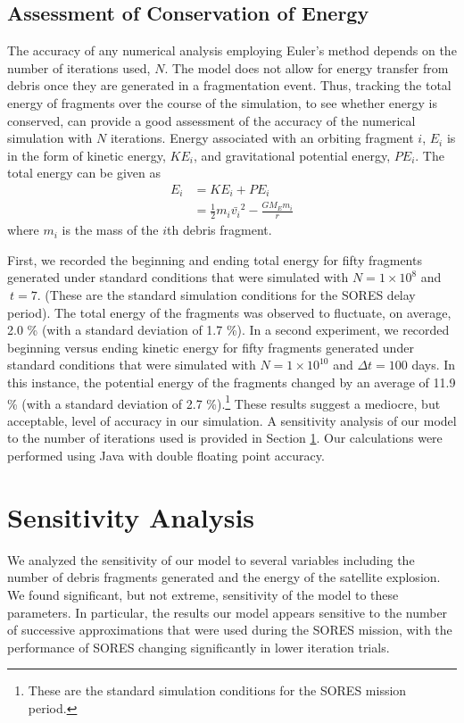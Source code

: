 \documentclass[12pt]{scrartcl}
\begin{document}
\subsection{Assessment of Conservation of Energy} \label{subsec:cons_energy}

The accuracy of any numerical analysis employing Euler's method depends on the number of iterations used, $N$. The model does not allow for energy transfer from debris once they are generated in a fragmentation event. Thus, tracking the total energy of fragments over the course of the simulation, to see whether energy is conserved, can provide a good assessment of the accuracy of the numerical simulation with $N$ iterations. Energy associated with an orbiting fragment $i$, $E_{i}$ is in the form of kinetic energy, $\mathit{KE}_{i}$, and gravitational potential energy, $\mathit{PE}_{i}$. The total energy can be given as 
\begin{align}
E_{i} 
&= \mathit{KE}_{i} + \mathit{PE}_{i} \\
&= \frac{1}{2} m_{i} \bar{v_{i}}^2 - \frac{G M_{E} m_{i}}{r}
\end{align}
where $m_{i}$ is the mass of the $i$th debris fragment.

First, we recorded the beginning and ending total energy for fifty fragments generated under standard conditions that were simulated with $N = 1\times10^{8}$ and $\ t = 7$. (These are the standard simulation conditions for the SORES delay period). The total energy of the fragments was observed to fluctuate, on average, 2.0 \% (with a standard deviation of 1.7 \%). In a second experiment, we recorded beginning versus ending kinetic energy for fifty fragments generated under standard conditions that were simulated with $N = 1\times10^{10}$ and $\Delta t = 100$ days. In this instance, the potential energy of the fragments changed by an average of 11.9 \% (with a standard deviation of 2.7 \%).\footnote{These are the standard simulation conditions for the SORES mission period.} These results suggest a mediocre, but acceptable, level of accuracy in our simulation. A sensitivity analysis of our model to the number of iterations used is provided in Section \ref{sec:sensitivity_analysis}. Our calculations were performed using Java with double floating point accuracy.

\section{Sensitivity Analysis} \label{sec:sensitivity_analysis}
We analyzed the sensitivity of our model to several variables including the number of debris fragments generated and the energy of the satellite explosion. We found significant, but not extreme, sensitivity of the model to these parameters. In particular, the results our model appears sensitive to the number of successive approximations that were used during the SORES mission, with the performance of SORES changing significantly in lower iteration trials. 
\end{document}
